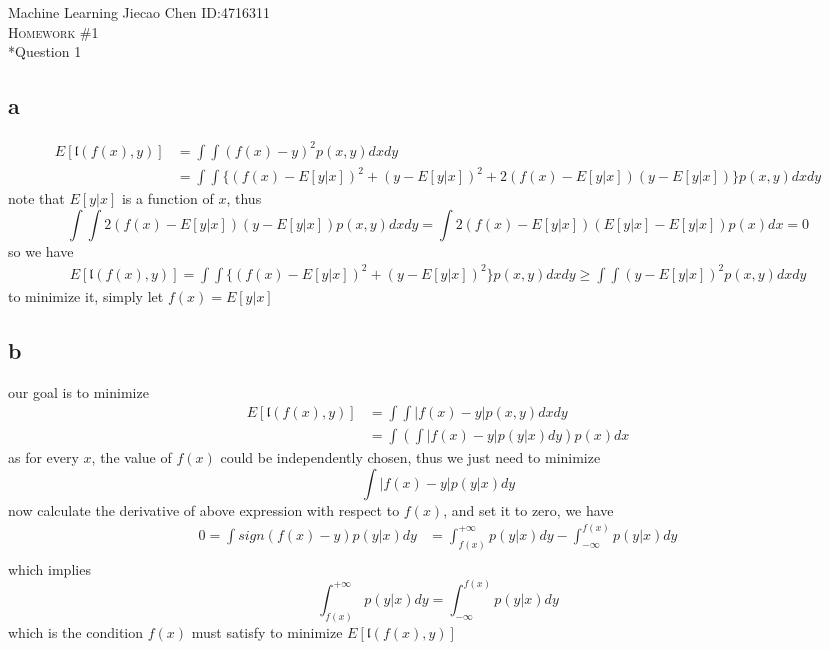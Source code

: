\documentclass[12pt]{amsart}
\makeatletter
\renewcommand{\section}{\@startsection{section}{1}{0mm}
{-\baselineskip}{0.5\baselineskip}{\bf\leftline}}
\makeatother
\begin{document}
\noindent Machine Learning \hfill Jiecao Chen \hfill ID:4716311 \\
\textsc{Homework \#1}\\



\section*{Question 1} 
\subsection*{a}
\begin{align*}
	E[\mathfrak{l}(f(x), y)] 
	&= \int\int (f(x) - y)^2 p(x, y) dxdy\\
	&= \int\int
		\{ (f(x) - E[y|x])^2 + (y - E[y|x])^2 +
	 	 2(f(x) - E[y|x]) (y - E[y|x]) \} p(x, y) dxdy					
\end{align*}
note that $E[y|x]$ is a function of $x$, thus
$$
	\int\int 2(f(x) - E[y|x]) (y - E[y|x]) p(x, y) dxdy	=
	\int 2(f(x) - E[y|x]) (E[y|x] - E[y|x]) p(x) dx =
	0	
$$
so we have 
\begin{align*}
	E[\mathfrak{l}(f(x), y)]  = 
	\int\int
		\{ (f(x) - E[y|x])^2 + (y - E[y|x])^2
	 	\} p(x, y) dxdy	\geq \int\int  (y - E[y|x])^2 p(x, y) dxdy
\end{align*}
to minimize it, simply let $f(x) = E[y|x]$

\subsection*{b}
our goal is to minimize
\begin{align*}
	E[\mathfrak{l}(f(x), y)]  
	&=	\int\int |f(x) - y| p(x, y) dx dy\\
	&=	\int (\int |f(x) - y| p(y|x)	dy) p(x)dx	
\end{align*}
as for every $x$, the value of $f(x)$ could be independently chosen, 
thus we just need to minimize
$$
	\int |f(x) - y| p(y|x)	dy
$$
now calculate the derivative of above expression with respect to $f(x)$, and set
it to zero, we have
\begin{align*}
	0 = \int sign( f(x) - y ) p(y|x) dy 
	&= \int_{f(x)}^{+\infty} p(y|x) dy - \int^{f(x)}_{-\infty} p(y|x) dy\\	
\end{align*}
which implies 
$$
	\int_{f(x)}^{+\infty} p(y|x) dy = \int^{f(x)}_{-\infty} p(y|x) dy
$$
which is the condition $f(x)$ must satisfy to minimize $E[\mathfrak{l}(f(x), y)]$
\end{document}
